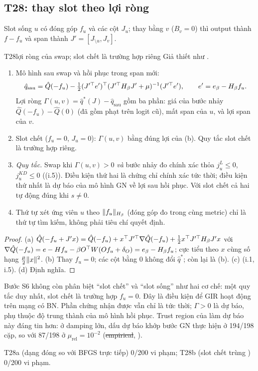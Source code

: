 \subsection{T28: thay slot theo lợi ròng}

Slot sống $u$ có đóng góp $f_u$ và các cột $J_u$; thay bằng $v$ ($B_v=0$) thì output thành $f-f_u$ và span thành $J'=[J_{\setminus u},J_v]$.

\begin{namedthm}{T28}{lợi ròng của swap; slot chết là trường hợp riêng}
Giả thiết như .
\begin{enumerate}[label=(\alph*)]
\item Mô hình sau swap và hồi phục trong span mới:
\[\hat q_{\mathrm{sau}}=\hat Q(-f_u)-\tfrac12(J'^{\top}e')^{\top}(J'^{\top}H_\beta J'+\mu)^{-1}(J'^{\top}e'),\qquad e'=e_\beta-H_\beta f_u .\]
Lợi ròng $\Gamma(u,v)=\hat q^*(J)-\hat q_{\mathrm{sau}}$ gồm ba phần: giá của bước nhảy $\hat Q(-f_u)-\hat Q(0)$ (đã gồm phạt trên logit cũ), mất span của $u$, và lợi span của $v$.
\item Slot chết ($f_u=0$, $J_u=0$): $\Gamma(u,v)$ bằng đúng lợi của (b). Quy tắc slot chết là trường hợp riêng.
\item \emph{Quy tắc.} Swap khi $\Gamma(u,v)>0$ \emph{và} bước nhảy đo chính xác thỏa $j_u^L\le0$, $j_u^{KD}\le0$ ((i.5)). Điều kiện thứ hai là chứng chỉ chính xác tức thời; điều kiện thứ nhất là dự báo của mô hình GN về lợi sau hồi phục. Với slot chết cả hai tự động đúng khi $s\ne0$.
\item Thứ tự xét ứng viên $u$ theo $\lVert f_u\rVert_{H_\beta}$ (đóng góp đo trong cùng metric) chỉ là thứ tự tìm kiếm, không phải tiêu chí quyết định.
\end{enumerate}
\end{namedthm}
\begin{proof}
(a) $\hat Q(-f_u+J'x)=\hat Q(-f_u)+x^{\top} J'^{\top}\nabla\hat Q(-f_u)+\tfrac12x^{\top} J'^{\top}H_\beta J'x$ với $\nabla\hat Q(-f_u)=e-Hf_u-\beta O^{\top} W(Of_u+\delta_O)=e_\beta-H_\beta f_u$; cực tiểu theo $x$ cùng số hạng $\tfrac\mu2\lVert x\rVert^2$.
(b) Thay $f_u=0$; các cột bằng $0$ không đổi $\hat q^*$; còn lại là (b).
(c) (i.1, i.5).
(d) Định nghĩa.
\end{proof}
\begin{hequa}
Bước S6 không còn phân biệt ``slot chết'' và ``slot sống'' như hai cơ chế: một quy tắc duy nhất, slot chết là trường hợp $f_u=0$. Đây là điều kiện để GIR hoạt động trên mạng có BN. Phần chứng nhận được vẫn chỉ là tức thời; $\Gamma>0$ là dự báo, phụ thuộc độ trung thành của mô hình hồi phục. Trust region của  làm dự báo này đáng tin hơn: ở damping lớn, dấu dự báo khớp bước GN thực hiện ở 194/198 cặp, so với 87/198 ở $\mu_{\mathrm{rel}}=10^{-2}$ (\st{empirical}, ).
\end{hequa}
\begin{kiem}
T28a (dạng đóng so với BFGS trực tiếp) 0/200 vi phạm; T28b (slot chết trùng ) 0/200 vi phạm.
\end{kiem}

